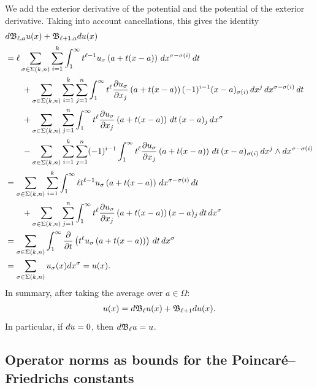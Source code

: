 \documentclass[10pt,letterpaper]{article}
\newcommand\cye[1]{%
  \protect\leavevmode
  \begingroup
    \color{red!35!yellow}%
    #1%
  \endgroup
}
\begin{document}
We add the exterior derivative of the potential and the potential of the exterior derivative.
Taking into account cancellations, this gives the identity 
\begin{align*}
    &
    d {\mathfrak B}_{\ell,a} u(x)
    +
    {\mathfrak B}_{\ell+1,a} d u(x)
    \\&
    =
    \ell
    \sum_{\sigma \in \Sigma(k,n)} \sum_{i=1}^{k}
    \int_{1}^\infty 
    t^{\ell-1} u_{\sigma}\left(a+t(x-a)\right) \,dx^{\sigma-\sigma(i)} \,dt 
    \\&\qquad
    + 
    \sum_{\sigma \in \Sigma(k,n)} \sum_{i=1}^{k} \sum_{j=1}^{n}
    \int_{1}^\infty 
    t^{\ell} \frac{ \partial u_{\sigma} }{\partial x_{j}}\left(a+t(x-a)\right) (-1)^{i-1} (x-a)_{\sigma(i) } \,dx^{j} \,dx^{\sigma-\sigma(i)} \,dt 
    \\&\qquad
    +
    \sum_{\sigma \in \Sigma(k,n)} \sum_{j=1}^{n}
    \int_{1}^\infty t^{\ell} \frac{ \partial u_{\sigma} }{\partial x_{j}}\left(a+t(x-a)\right) \,dt \,(x-a)_{j} \,dx^{\sigma}
    \\&\qquad
    - 
    \sum_{\sigma \in \Sigma(k,n)} \sum_{i=1}^{k} \sum_{j=1}^{n}
    (-1)^{i-1}
    \int_{1}^\infty t^{\ell} \frac{ \partial u_{\sigma} }{\partial x_{j}}\left(a+t(x-a)\right) \,dt 
    \,(x-a)_{\sigma(i)} \,dx^{j} \wedge dx^{\sigma-\sigma(i)}
    \\&
    =
    \sum_{\sigma \in \Sigma(k,n)} \sum_{i=1}^{k}
    \int_{1}^\infty 
    \ell t^{\ell-1} u_{\sigma}\left(a+t(x-a)\right) \,dx^{\sigma-\sigma(i)} \,dt 
    \\&\qquad
    +
    \sum_{\sigma \in \Sigma(k,n)} \sum_{j=1}^{n}
    \int_{1}^\infty t^{\ell} \frac{ \partial u_{\sigma} }{\partial x_{j}}\left(a+t(x-a)\right) (x-a)_{j} \,dt \,dx^{\sigma}
    \\&
    =
    \sum_{\sigma \in \Sigma(k,n)} 
    \int_{1}^\infty \frac{\partial}{\partial t} \left( t^{\ell} u_{\sigma}\left(a+t(x-a)\right) \right) \,dt \,dx^{\sigma}
    \\&
    =
    \sum_{\sigma \in \Sigma(k,n)} 
    u_{\sigma}(x) dx^{\sigma}
    =
    u(x)
    .
\end{align*}
In summary, after taking the average over $a \in \Omega$:
\begin{align*}
    u(x) = d {\mathfrak B}_{\ell} u(x) + {\mathfrak B}_{\ell+1} d u(x)
    .
\end{align*}
In particular, if $d u = 0$, then $d {\mathfrak B}_{\ell} u = u$.

\subsection{\cye{Operator norms as bounds for the Poincar\'e--Friedrichs constants}}
\end{document}
